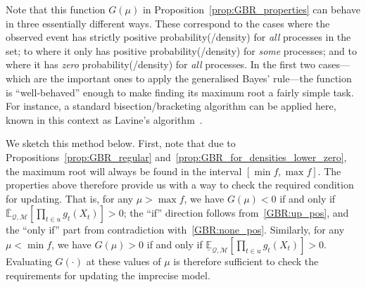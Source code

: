 \documentclass[twoside,11pt]{article}
\makeatletter
\newcommand{\reals}{\mathbb{R}}
\newcommand{\lexp}{\underline{\mathbb{E}}_{\rateset,\mathcal{M}}}
\newcommand{\uexp}{\overline{\mathbb{E}}_{\rateset,\mathcal{M}}}
\newcommand{\rateset}{\mathcal{Q}}
\newcommand{\customlabel}[2]{%
   \protected@write \@auxout {}{\string \newlabel {#1}{{#2}{\thepage}{#2}{#1}{}} }%
   \hypertarget{#1}{\emph{#2}\!}
}
\makeatother
\begin{document}
\begin{proposition}
%
%
%
\end{proposition}

Note that this function $G(\mu)$ in Proposition~\ref{prop:GBR_properties} can behave in three essentially different ways. These correspond to the cases where the observed event has strictly positive probability(/density) for \emph{all} processes in the set; to where it only has positive probability(/density) for \emph{some} processes; and to where it has \emph{zero} probability(/density) for \emph{all} processes.
In the first two cases---which are the important ones to apply the generalised Bayes' rule---the function is ``well-behaved'' enough to make finding its maximum root a fairly simple task. For instance, a standard bisection/bracketing algorithm can be applied here, known in this context as Lavine's algorithm~\citep{cozman1997alternatives}.

We sketch this method below. First, note that due to Propositions~\ref{prop:GBR_regular} and~\ref{prop:GBR_for_densities_lower_zero}, the maximum root will always be found in the interval $[\min f, \max f]$. The properties above therefore provide us with a way to check the required condition for updating. That is, for any $\mu>\max f$, we have $G(\mu)<0$ if and only if $\uexp[\prod_{t\in u} g_{t}(X_{t})]>0$; the ``if'' direction follows from~\ref{GBR:up_pos}, and the ``only if'' part from contradiction with~\ref{GBR:none_pos}. Similarly, for any $\mu < \min f$, we have $G(\mu)>0$ if and only if $\lexp[\prod_{t\in u} g_{t}(X_{t})]>0$. Evaluating $G(\cdot)$ at these values of $\mu$ is therefore sufficient to check the requirements for updating the imprecise model. %
\end{document}

